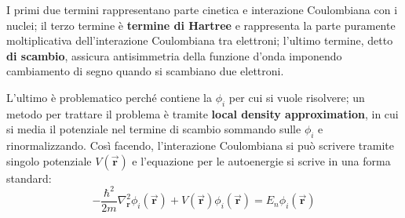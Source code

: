 \documentclass[10pt, a4paper]{scrartcl}
\numberwithin{equation}{subsection}
\theoremstyle{style1}
\begin{document}
I primi due termini rappresentano parte cinetica e interazione Coulombiana con i nuclei; il terzo termine \`e \textbf{termine di Hartree} e rappresenta la parte puramente moltiplicativa dell'interazione Coulombiana tra elettroni; l'ultimo termine, detto \textbf{di scambio}, assicura antisimmetria della funzione d'onda imponendo cambiamento di segno quando si scambiano due elettroni.

L'ultimo \`e problematico perch\'e contiene la $\phi _i$ per cui si vuole risolvere;
un metodo per trattare il problema \`e tramite \textbf{local density approximation}, in cui si media il potenziale nel termine di scambio sommando sulle $\phi _i$ e rinormalizzando. 
Cos\`i facendo, l'interazione Coulombiana si pu\`o scrivere tramite singolo potenziale $V(\vec{\mathbf{r} })$ e l'equazione per le autoenergie si scrive in una forma standard:
\begin{equation}\label{eser}
	-\frac{\hbar ^2}{2m} \nabla ^2_\mathbf{r} \phi _i(\vec{\mathbf{r} }) + V(\vec{\mathbf{r} }) \phi _i (\vec{\mathbf{r} }) = E_n \phi _i (\vec{\mathbf{r} })
\end{equation}
\end{document}
